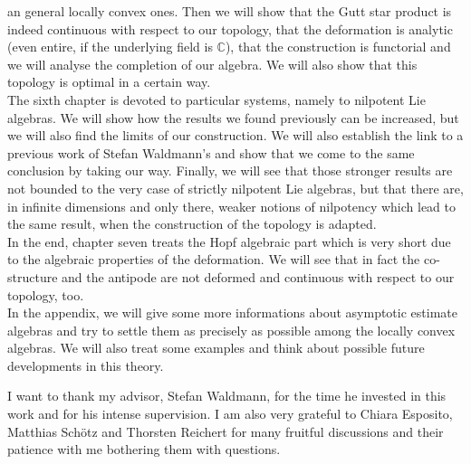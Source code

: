 an general locally convex ones. Then we will show that the Gutt star product is 
indeed continuous with respect to our topology, that the deformation is 
analytic (even entire, if the underlying field is $\mathbb{C}$), that the 
construction is functorial and we will analyse the completion of our algebra. 
We will also show that this topology is optimal in a certain way.\\
The sixth chapter is devoted to particular systems, namely to nilpotent Lie 
algebras. We will show how the results we found previously can be increased, 
but we will also find the limits of our construction. We will also establish 
the link to a previous work of Stefan Waldmann's and show that we come to the 
same conclusion by taking our way. Finally, we will see that those stronger 
results are not bounded to the very case of strictly nilpotent Lie algebras, 
but that there are, in infinite dimensions and only there, weaker notions of 
nilpotency which lead to the same result, when the construction of the 
topology is adapted.\\
In the end, chapter seven treats the Hopf algebraic part which is very short 
due to the algebraic properties of the deformation. We will see that in fact 
the co-structure and the antipode are not deformed and continuous with respect 
to our topology, too.\\
In the appendix, we will give some more informations about asymptotic estimate 
algebras and try to settle them as precisely as possible among the locally 
convex algebras. We will also treat some examples and think about possible 
future developments in this theory.


I want to thank my advisor, Stefan Waldmann, for the time he invested in this 
work and for his intense supervision. I am also very grateful to Chiara 
Esposito, Matthias Sch\"otz and Thorsten Reichert for many fruitful discussions 
and their patience with me bothering them with questions.
